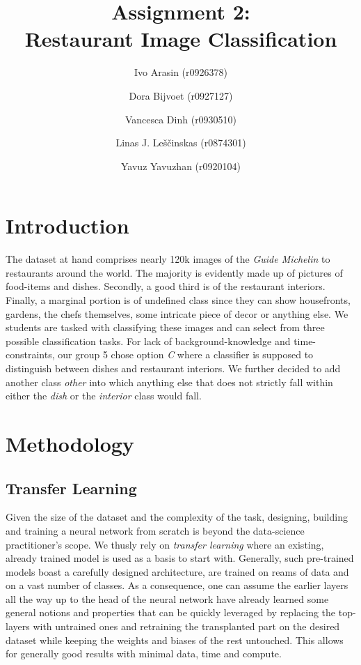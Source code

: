 \documentclass[11pt, oneside]{article}   	%
\title{Assignment 2: \\ Restaurant Image Classification}
\author{\centering Ivo Arasin (r0926378) \and Dora Bijvoet (r0927127) \and Vancesca Dinh (r0930510) \and Linas J. Leščinskas (r0874301) \and Yavuz Yavuzhan (r0920104)}
\begin{document}
\maketitle
\section{Introduction}
The dataset at hand comprises nearly 120k images of the \textit{Guide Michelin} to restaurants around the world. The majority is evidently made up of pictures of food-items and dishes. Secondly, a good third is of the restaurant interiors. Finally, a marginal portion is of undefined class since they can show housefronts, gardens, the chefs themselves, some intricate piece of decor or anything else. 
We students are tasked with classifying these images and can select from three possible classification tasks. For lack of background-knowledge and time-constraints, our group 5 chose option \textit{C} where a classifier is supposed to distinguish between dishes and restaurant interiors. We further decided to add another class \textit{other} into which anything else that does not strictly fall within either the \textit{dish} or the \textit{interior} class would fall.

\section{Methodology}
\subsection{Transfer Learning}
Given the size of the dataset and the complexity of the task, designing, building and training a neural network from scratch is beyond the data-science practitioner's scope. We thusly rely on \textit{transfer learning} where an existing, already trained model is used as a basis to start with. Generally, such pre-trained models boast a carefully designed architecture, are trained on reams of data and on a vast number of classes. As a consequence, one can assume the earlier layers all the way up to the head of the neural network have already learned some general notions and properties that can be quickly leveraged by replacing the top-layers with untrained ones and retraining the transplanted part on the desired dataset while keeping the weights and biases of the rest untouched. This allows for generally good results with minimal data, time and compute.
\end{document}
